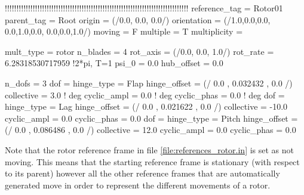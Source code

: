 \begin{inputfile}[frame=single, caption={references\_rotor.in}, label={file:references_rotor.in}]
!!!!!!!!!!!!!!!!!!!!!!!!!!!!!!!!!!!!!!!!!!!!!!!!!!!!!!!!!!!!!!!!!!!!!!!!!!!!!!!
reference_tag = Rotor01
parent_tag = Root
origin = (/0.0, 0.0, 0.0/)
orientation = (/1.0,0.0,0.0, 0.0,1.0,0.0, 0.0,0.0,1.0/)
moving = F
multiple = T
multiplicity = {
  mult_type = rotor
  n_blades = 4
  rot_axis = (/0.0, 0.0, 1.0/)
  rot_rate = 6.28318530717959 !2*pi, T=1
  psi_0 = 0.0
  hub_offset = 0.0

  n_dofs = 3
  dof = {
    hinge_type = Flap
    hinge_offset = (/ 0.0 , 0.032432 , 0.0 /)
    collective  =  3.0     ! deg
    cyclic_ampl =  0.0     ! deg
    cyclic_phas =  0.0     ! deg
  }
  dof = {
    hinge_type = Lag
    hinge_offset = (/ 0.0 , 0.021622 , 0.0 /)
    collective  = -10.0
    cyclic_ampl =  0.0
    cyclic_phas =  0.0
  }
  dof = {
    hinge_type = Pitch
    hinge_offset = (/ 0.0 , 0.086486 , 0.0 /)
    collective  = 12.0
    cyclic_ampl =  0.0
    cyclic_phas =  0.0
  }

} 
\end{inputfile}


Note that the rotor reference frame in file \ref{file:references_rotor.in} 
is set as not moving. This means that the starting reference frame is stationary 
(with respect to its parent) however all the other reference frames that are 
automatically generated move in order to represent the different movements of a rotor.

